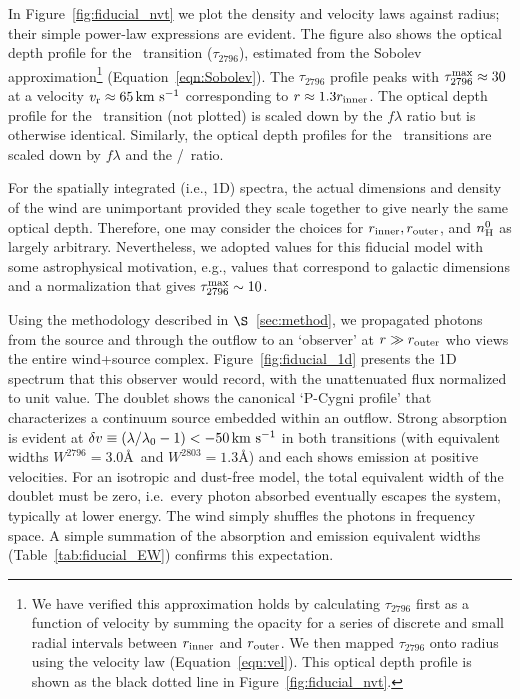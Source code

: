 \documentclass[12pt,preprint]{aastex}
\begin{document}
In Figure~\ref{fig:fiducial_nvt} we plot the density and velocity
laws against radius;  
their simple power-law expressions are evident.  The figure also
shows the optical depth profile for the \mgiia\ transition
($\tau_{2796}$), estimated from the Sobolev approximation\footnote{We
  have verified this approximation holds by calculating 
  $\tau_{2796}$ first
  as a function of velocity by summing the opacity for a series of
  discrete and small radial intervals
  between $r_{\rm inner}$  and $r_{\rm outer}$.   We then mapped
  $\tau_{2796}$ onto radius using the velocity law
  (Equation~\ref{eqn:vel}). This optical depth profile is shown as the
black dotted line in Figure~\ref{fig:fiducial_nvt}.}
(Equation~\ref{eqn:Sobolev}). 
The $\tau_{2796}$ profile peaks with $\tau_{2796}^{\rm max} \approx 30$
at a velocity $v_{\rm r} \approx 65 \, {\rm km~s^{-1}}$ corresponding to $r \approx 1.3
r_{\rm inner}$.  The optical depth profile for the \mgiib\ transition
(not plotted) is scaled down by the $f\lambda$ ratio but is otherwise identical.  Similarly,
the optical depth profiles for the \feiid\ transitions are
scaled down by $f \lambda$ and the \nfe/\nmg\ ratio.  

For the spatially integrated (i.e., 1D) spectra, the actual dimensions and density of the wind are
unimportant provided they scale together to give nearly the same
optical depth. Therefore, one may consider the choices for
$r_{\rm inner}, r_{\rm outer}$, and $n_{\rm H}^0$ as largely arbitrary.
Nevertheless, we adopted values for this fiducial model with
some astrophysical motivation,  e.g., values that correspond to
galactic dimensions and a normalization that gives $\tau_{2796}^{\rm
  max} \sim 10$.


Using the methodology described in $\S$~\ref{sec:method}, we
propagated photons from the source and through the outflow to an
`observer' at $r \gg r_{\rm outer}$ who views the entire wind+source
complex.  Figure~\ref{fig:fiducial_1d} presents the 1D spectrum
that this observer would record, with the unattenuated flux
normalized to unit value.   The  doublet
shows the canonical `P-Cygni profile' that characterizes a continuum
source embedded within an outflow.  Strong absorption is evident at
$\delta v  \equiv (\lambda/\lambda_0 - 1) < -50 \, {\rm km~s^{-1}}$ in both
transitions (with equivalent widths $W^{2796} =
3.0$\AA\ and $W^{2803} = 1.3$\AA) and each shows emission at
positive velocities.  For an isotropic and dust-free model, the
total equivalent width of the doublet must be zero,
i.e.\ every photon
absorbed eventually escapes the system, typically at lower
energy.  The wind simply shuffles the photons in frequency space.
A simple summation of the absorption and emission equivalent widths
(Table~\ref{tab:fiducial_EW}) confirms this expectation.
\end{document}

